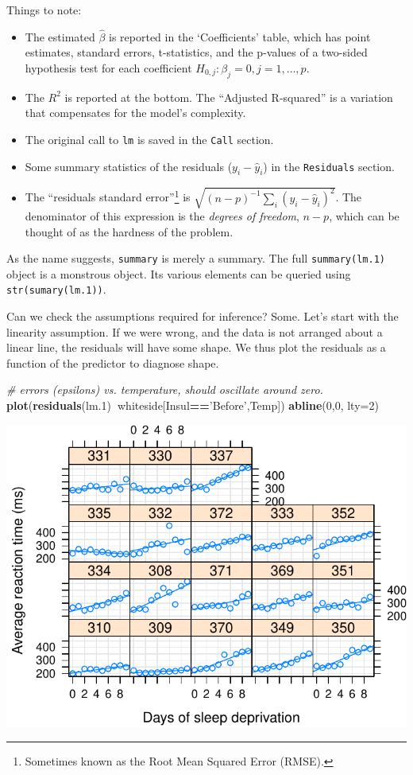 \documentclass[]{book}
\newenvironment{Shaded}{\begin{snugshade}}{\end{snugshade}}
\newcommand{\KeywordTok}[1]{\textcolor[rgb]{0.13,0.29,0.53}{\textbf{#1}}}
\newcommand{\DataTypeTok}[1]{\textcolor[rgb]{0.13,0.29,0.53}{#1}}
\newcommand{\DecValTok}[1]{\textcolor[rgb]{0.00,0.00,0.81}{#1}}
\newcommand{\StringTok}[1]{\textcolor[rgb]{0.31,0.60,0.02}{#1}}
\newcommand{\CommentTok}[1]{\textcolor[rgb]{0.56,0.35,0.01}{\textit{#1}}}
\newcommand{\OperatorTok}[1]{\textcolor[rgb]{0.81,0.36,0.00}{\textbf{#1}}}
\newcommand{\NormalTok}[1]{#1}
\providecommand{\tightlist}{%
  \setlength{\itemsep}{0pt}\setlength{\parskip}{0pt}}
\theoremstyle{definition}
\theoremstyle{definition}
\theoremstyle{definition}
\theoremstyle{remark}
\begin{document}
Things to note:

\begin{itemize}
\tightlist
\item
  The estimated \(\hat \beta\) is reported in the `Coefficients' table,
  which has point estimates, standard errors, t-statistics, and the
  p-values of a two-sided hypothesis test for each coefficient
  \(H_{0,j}:\beta_j=0, j=1,\dots,p\).
\item
  The \(R^2\) is reported at the bottom. The ``Adjusted R-squared'' is a
  variation that compensates for the model's complexity.
\item
  The original call to \texttt{lm} is saved in the \texttt{Call}
  section.
\item
  Some summary statistics of the residuals (\(y_i-\hat y_i\)) in the
  \texttt{Residuals} section.
\item
  The ``residuals standard error''\footnote{Sometimes known as the Root
    Mean Squared Error (RMSE).} is
  \(\sqrt{(n-p)^{-1} \sum_i (y_i-\hat y_i)^2}\). The denominator of this
  expression is the \emph{degrees of freedom}, \(n-p\), which can be
  thought of as the hardness of the problem.
\end{itemize}

As the name suggests, \texttt{summary} is merely a summary. The full
\texttt{summary(lm.1)} object is a monstrous object. Its various
elements can be queried using \texttt{str(sumary(lm.1))}.

Can we check the assumptions required for inference? Some. Let's start
with the linearity assumption. If we were wrong, and the data is not
arranged about a linear line, the residuals will have some shape. We
thus plot the residuals as a function of the predictor to diagnose
shape.

\begin{Shaded}
\begin{Highlighting}[]
\CommentTok{# errors (epsilons) vs. temperature, should oscillate around zero.}
\KeywordTok{plot}\NormalTok{(}\KeywordTok{residuals}\NormalTok{(lm.}\DecValTok{1}\NormalTok{)}\OperatorTok{~}\NormalTok{whiteside[Insul}\OperatorTok{==}\StringTok{'Before'}\NormalTok{,Temp])}
\KeywordTok{abline}\NormalTok{(}\DecValTok{0}\NormalTok{,}\DecValTok{0}\NormalTok{, }\DataTypeTok{lty=}\DecValTok{2}\NormalTok{)}
\end{Highlighting}
\end{Shaded}

\includegraphics[width=0.5\linewidth]{Rcourse_files/figure-latex/unnamed-chunk-161-1}
\end{document}
